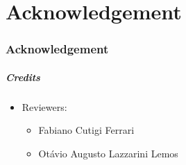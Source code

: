\part{Acknowledgement}
\section*{Acknowledgement}


\begin{frame}[c,label=credits]
\frametitle{Credits}

\centering
{}

\begin{itemize}
	\item Reviewers:
	\begin{itemize}
		\item Fabiano Cutigi Ferrari
		\item Otávio Augusto Lazzarini Lemos
	\end{itemize}
\end{itemize}
\end{frame}
